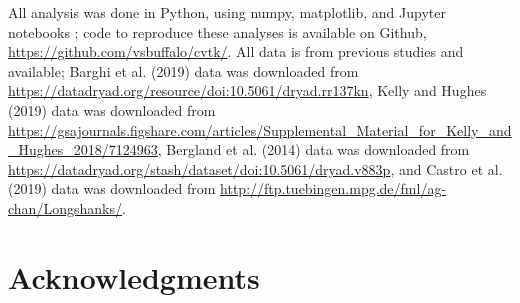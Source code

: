 \documentclass[9pt,twocolumn,twoside]{pnas-new}
\begin{document}
{All analysis was done in Python, using numpy, matplotlib, and Jupyter notebooks
\cite{Rossum1995-ni,Oliphant2006-ul,Kluyver2016-wo,Hunter2007-ys}; code to
reproduce these analyses is available on Github,
\url{https://github.com/vsbuffalo/cvtk/}. All data is from previous studies and
available; Barghi et al. (2019) data was downloaded from
\url{https://datadryad.org/resource/doi:10.5061/dryad.rr137kn}, Kelly and
Hughes (2019) data was downloaded from
\url{https://gsajournals.figshare.com/articles/Supplemental_Material_for_Kelly_and_Hughes_2018/7124963},
Bergland et al. (2014) data was downloaded from
\url{https://datadryad.org/stash/dataset/doi:10.5061/dryad.v883p}, and Castro
et al. (2019) data was downloaded from
\url{http://ftp.tuebingen.mpg.de/fml/ag-chan/Longshanks/}.
}

\showmatmethods{} 


\showacknow{}

\section*{Acknowledgments} 

\end{document}
